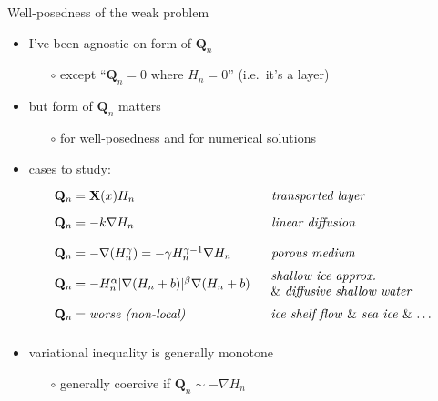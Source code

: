 \documentclass{beamer}
\newcommand\bQ{\mathbf{Q}}
\newcommand\bX{\mathbf{X}}
\newcommand{\grad}{\nabla}
\begin{document}
\begin{frame}{Well-posedness of the weak problem}
\begin{itemize}
\item I've been agnostic on form of $\bQ_n$
  \begin{itemize}
  \item[$\circ$] except ``$\bQ_n=0$ where $H_n=0$'' (i.e.~it's a layer)
  \end{itemize}
\item but form of $\bQ_n$ matters
  \begin{itemize}
  \item[$\circ$] for well-posedness and for numerical solutions
  \end{itemize}
\item cases to study:\small
$$\begin{array}{ll}
  \bQ_n = \bX(x) H_n & \text{\phantom{\Big|}\emph{transported layer}} \\
  \bQ_n = -k \grad H_n & \text{\phantom{\bigg|}\emph{linear diffusion}} \\
  \bQ_n = - \grad(H_n^\gamma) = - \gamma H_n^{\gamma-1} \grad H_n
     & \text{\phantom{\Big|}\emph{porous medium}}\phantom{\bigg|} \\
  \bQ_n = - H_n^\alpha |\grad (H_n+b)|^\beta \grad (H_n+b)\phantom{\bigg|} &
        \hspace{-0.75mm}\begin{array}{ll}
        \text{\emph{shallow ice approx.}} \\
        \text{\& \emph{diffusive shallow water}}
        \end{array} \\
  \bQ_n = \text{\emph{worse (non-local)}}\phantom{\bigg|} & \hspace{-0.75mm}\begin{array}{ll}
        \text{\emph{ice shelf flow} \& \emph{sea ice} \& \dots}
        \end{array}
\end{array}$$

\vspace{-4mm}
\item variational inequality is generally monotone
  \begin{itemize}
  \item[$\circ$] generally coercive if $\bQ_n \sim - \grad H_n$
  \end{itemize}
\end{itemize}
\end{frame}
\end{document}
